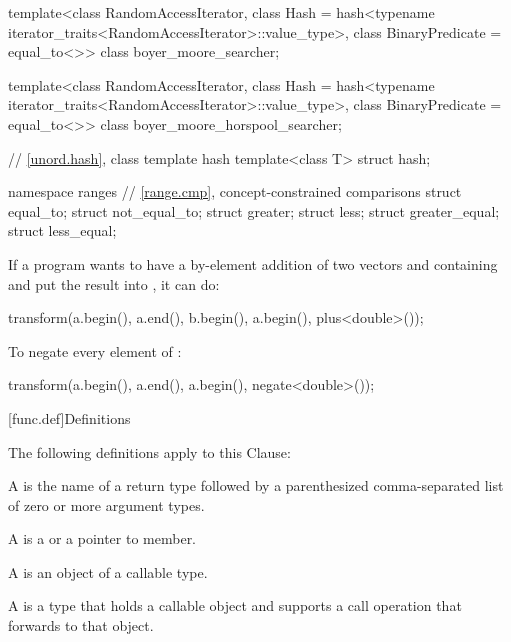 \begin{codeblock}
{  template<class RandomAccessIterator,
           class Hash = hash<typename iterator_traits<RandomAccessIterator>::value_type>,
           class BinaryPredicate = equal_to<>>
    class boyer_moore_searcher;

  template<class RandomAccessIterator,
           class Hash = hash<typename iterator_traits<RandomAccessIterator>::value_type>,
           class BinaryPredicate = equal_to<>>
    class boyer_moore_horspool_searcher;

  // \ref{unord.hash}, class template hash
  template<class T>
    struct hash;

  namespace ranges {
    // \ref{range.cmp}, concept-constrained comparisons
    struct equal_to;
    struct not_equal_to;
    struct greater;
    struct less;
    struct greater_equal;
    struct less_equal;
  }
}
\end{codeblock}

\pnum
\begin{example}
If a \Cpp{} program wants to have a by-element addition of two vectors 
and  containing  and put the result into ,
it can do:

\begin{codeblock}
transform(a.begin(), a.end(), b.begin(), a.begin(), plus<double>());
\end{codeblock}
\end{example}

\pnum
\begin{example}
To negate every element of :

\begin{codeblock}
transform(a.begin(), a.end(), a.begin(), negate<double>());
\end{codeblock}

\end{example}

[func.def]{Definitions}

\pnum
The following definitions apply to this Clause:

\pnum
A  is the name of a return type followed by a
parenthesized comma-separated list of zero or more argument types.

\pnum
A  is a  or a pointer to member.

\pnum
A  is an object of a callable type.

\pnum
A  is a type that holds a callable object
and supports a call operation that forwards to that object.

